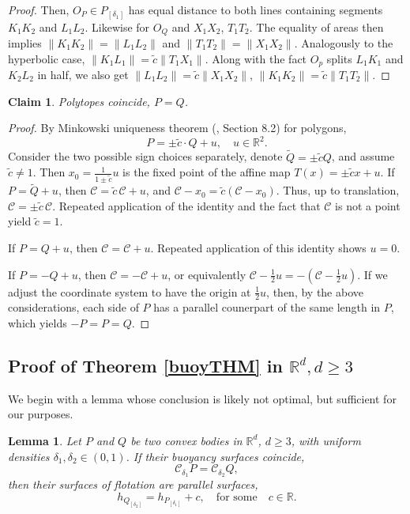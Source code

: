 \documentclass[12pt,letterpaper,reqno]{amsart}
\newtheorem{lemma}{Lemma}
\newtheorem{claim}{Claim}
\begin{document}
\begin{proof}
    Then, $O_P \in P_{[\delta_1]}$ has equal distance to both lines containing segments $K_1K_2$ and $L_1L_2$. Likewise for $O_Q$ and $X_1X_2$, $T_1T_2$. The equality of areas then implies $\|K_1K_2\| = \|L_1L_2\|$ and $\|T_1T_2\| = \|X_1X_2\|$. 
    Analogously to the hyperbolic case, $\|K_1L_1\| = \tilde{c} \|T_1X_1\|$. Along with the fact $O_p$ splits $L_1K_1$ and $K_2L_2$ in half, we also get $\|L_1L_2\| = \tilde{c} \|X_1X_2\|$, $\|K_1K_2\| = \tilde{c} \|T_1T_2\|$.
    \end{proof}
    
\begin{claim}\label{shift}
Polytopes coincide, $P = Q$.
\end{claim}

\begin{proof}
By Minkowski uniqueness theorem (\cite{S}, Section 8.2) for polygons, 
$$
P = \pm \tilde{c} \cdot Q + u, \quad u \in \mathbb{R}^2.
$$
Consider the two possible sign choices separately, denote $\tilde{Q} = \pm \tilde{c} Q$, and assume $\tilde{c} \neq 1$. Then $x_0 = \frac{1}{1\pm \tilde{c}}u$ is the fixed point of the affine map $T(x) = \pm \tilde{c}x+u$. 
If $P=\tilde{Q}+u$, then $\mathcal{C}=\tilde{c}\, \mathcal{C}+u$, and $\mathcal{C}-x_0 = \tilde{c} (\mathcal{C}-x_0)$. Thus, up to translation, $\mathcal{C} = \pm \tilde{c} \, \mathcal{C}$. Repeated application of the identity and the fact that $\mathcal{C}$ is not a point yield $\tilde{c} = 1$.

If $P = Q+u$, then $\mathcal{C} = \mathcal{C} + u$. Repeated application of this identity shows $u=0$.

If $P=-Q+u$, then $\mathcal{C}=-\mathcal{C}+u$, or equivalently $\mathcal{C} - \frac{1}{2}u = -\left(\mathcal{C} - \frac 1 2 u\right)$.
If we adjust the coordinate system to have the origin at $\frac 1 2 u$, then, by the above considerations, each side of $P$ has a parallel counerpart of the same length in $P$, which yields $-P=P=Q$.
\end{proof}

   
\subsection{Proof of Theorem \ref{buoyTHM} in $\mathbb{R}^d, d \geq 3$}

We begin with a lemma whose conclusion is likely not optimal, but sufficient for our purposes.
\begin{lemma}\label{buoy}
    Let $P$ and $Q$ be two convex bodies in $\mathbb{R}^{d}$, $d\geq 3$, with uniform densities $\delta_1, \delta_2 \in (0,1)$.  If their buoyancy surfaces coincide, 
    $$\mathcal{C}_{\delta_1} P = \mathcal{C}_{\delta_2} Q,$$
    then their surfaces of flotation are parallel surfaces,
    $$
    h_{Q_{[\delta_2]}}=h_{P_{[\delta_1]}} + c, \quad \text{for some} \quad c \in \mathbb{R}.
    $$
\end{lemma}
\end{document}
